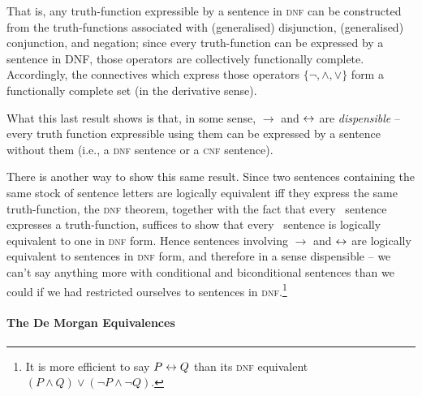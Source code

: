 That is, any truth-function expressible by a sentence in \textsc{dnf} can be constructed from the truth-functions associated with (generalised) disjunction, (generalised) conjunction, and negation; since every truth-function can be expressed by a sentence in DNF, those operators are collectively functionally complete. Accordingly, the connectives which express those operators $\{\neg,\wedge,\vee\}$ form a functionally complete set (in the derivative sense).


What this last result shows is that, in some sense, $\to$ and $\leftrightarrow$ are \emph{dispensible} – every truth function expressible using them can be expressed by a sentence without them (i.e., a \textsc{\lowercase{DNF}} sentence or a \textsc{cnf} sentence).

There is another way to show this same result. Since two sentences containing the same stock of sentence letters are logically equivalent iff they express the same truth-function, the \textsc{\lowercase{DNF}} theorem, together with the fact that every \lone\ sentence expresses a truth-function, suffices to show that every \lone\ sentence is logically equivalent to one in \textsc{\lowercase{DNF}} form. Hence sentences involving $\to$ and $\leftrightarrow$ are logically equivalent to sentences in \textsc{\lowercase{DNF}} form, and therefore in a sense dispensible – we can't say anything more with conditional and biconditional sentences than we could if we had restricted ourselves to sentences in \textsc{dnf}.\footnote{It is more efficient to say $P\leftrightarrow Q$ than its \textsc{dnf} equivalent $(P\wedge Q)\vee(¬P \wedge ¬Q)$.}



\paragraph{The De Morgan Equivalences}

